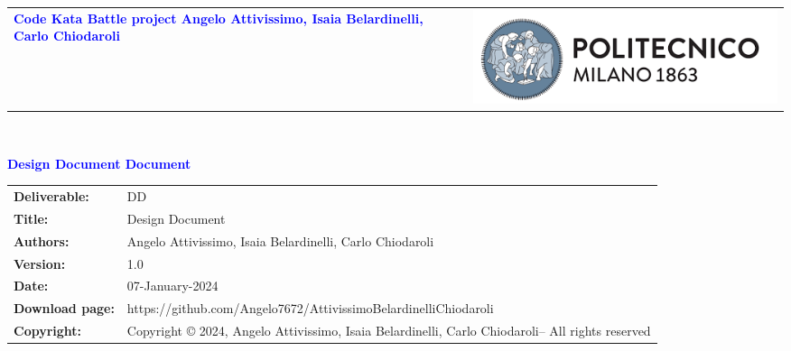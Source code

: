 




\begin{titlepage}



{\begin{table}[t!]
\centering
\begin{tabu} to \textwidth { X[1.3,r,p] X[1.7,l,p] }
\textcolor{Blue}
{\textbf{\small{Code Kata Battle project Angelo Attivissimo, Isaia Belardinelli, Carlo Chiodaroli}}} & \includegraphics[scale=0.5]{Images/PolimiLogo}
\end{tabu}
\end{table}}~\\ [7cm]


\begin{flushleft}

{\textcolor{Blue}{\textbf{\Huge{Design Document
        Document}}}} \\ [1cm]

\end{flushleft}

\end{titlepage}

\begin{table}[h!]
\begin{tabu} to \textwidth { X[0.3,r,p] X[0.7,l,p] }
\hline

\textbf{Deliverable:} & DD\\
\textbf{Title:} & Design Document \\
\textbf{Authors:} & Angelo Attivissimo, Isaia Belardinelli, Carlo Chiodaroli \\
\textbf{Version:} & 1.0 \\ 
\textbf{Date:} & 07-January-2024 \\
\textbf{Download page:} & https://github.com/Angelo7672/AttivissimoBelardinelliChiodaroli  \\
\textbf{Copyright:} & Copyright © 2024, Angelo Attivissimo, Isaia Belardinelli, Carlo Chiodaroli– All rights reserved \\
\hline
\end{tabu}
\end{table}




